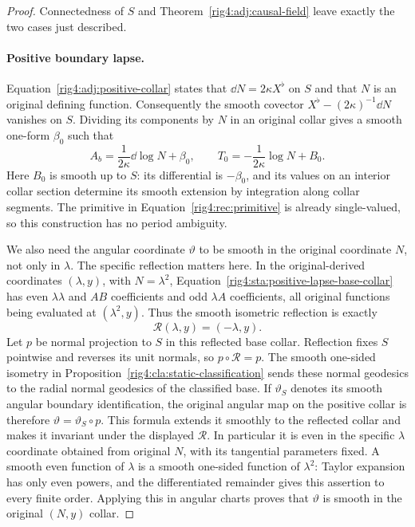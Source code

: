 \begin{proof}
Connectedness of $S$ and Theorem~\ref{rig4:adj:causal-field} leave exactly the two
cases just described.

\paragraph{Positive boundary lapse.}
Equation~\eqref{rig4:adj:positive-collar} states that
$\dd N=2\kappa X^\flat$ on $S$ and that $N$ is an original defining function.
Consequently the smooth covector
$X^\flat-(2\kappa)^{-1}\dd N$ vanishes on $S$.  Dividing its components by $N$
in an original collar gives a smooth one-form $\beta_0$ such that
\begin{equation}
 A_b=\frac1{2\kappa}\dd\log N+\beta_0,\qquad
 T_0=-\frac1{2\kappa}\log N+B_0.
 \label{rig4:rec:log-time}
\end{equation}
Here $B_0$ is smooth up to $S$: its differential is $-\beta_0$, and its values
on an interior collar section determine its smooth extension by integration
along collar segments.  The primitive in
Equation~\eqref{rig4:rec:primitive} is already single-valued, so this construction
has no period ambiguity.

We also need the angular coordinate $\vartheta$ to be smooth in the original
coordinate $N$, not only in $\lambda$.  The specific reflection matters here.
In the original-derived coordinates $(\lambda,y)$, with $N=\lambda^2$,
Equation~\eqref{rig4:sta:positive-lapse-base-collar} has even $\lambda\lambda$ and
$AB$ coefficients and odd $\lambda A$ coefficients, all original functions
being evaluated at $(\lambda^2,y)$.  Thus the smooth isometric reflection is
exactly
\[
 \mathcal R(\lambda,y)=(-\lambda,y).
\]
Let $p$ be normal projection to $S$ in this reflected base collar.
Reflection fixes $S$ pointwise and reverses its unit normals, so
$p\circ\mathcal R=p$.  The smooth one-sided isometry in
Proposition~\ref{rig4:cla:static-classification} sends these normal geodesics to
the radial normal geodesics of the classified base.  If $\vartheta_S$ denotes
its smooth angular boundary identification, the original angular map on the
positive collar is therefore $\vartheta=\vartheta_S\circ p$.  This formula
extends it smoothly to the reflected collar and makes it invariant under
the displayed $\mathcal R$.  In particular it is even in the specific
$\lambda$ coordinate obtained from original $N$, with its tangential
parameters fixed.  A smooth even function of
$\lambda$ is a smooth one-sided function of $\lambda^2$: Taylor expansion
has only even powers, and the differentiated remainder gives this assertion
to every finite order.  Applying this in angular charts proves that
$\vartheta$ is smooth in the original $(N,y)$ collar.


\end{proof}

